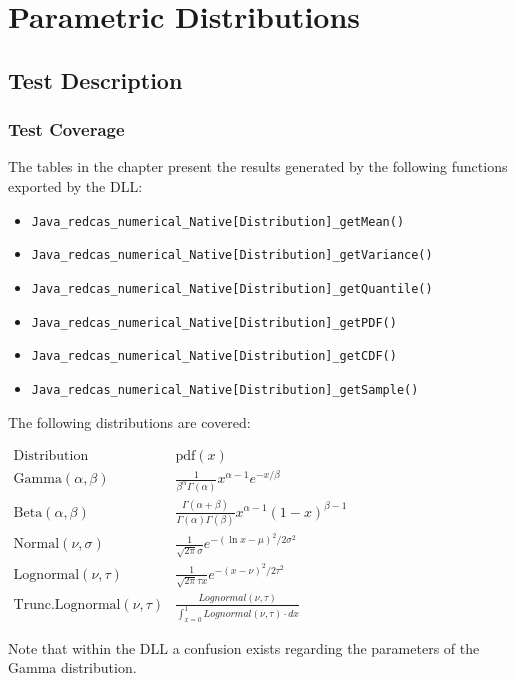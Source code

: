 \chapter{Parametric Distributions}

\section{Test Description}
\subsection{Test Coverage}
The tables in the chapter present the results generated by the following
functions exported by the DLL:
\begin{itemize}
\item  \texttt{Java\_redcas\_numerical\_Native[Distribution]\_getMean()}
\item  \texttt{Java\_redcas\_numerical\_Native[Distribution]\_getVariance()}
\item  \texttt{Java\_redcas\_numerical\_Native[Distribution]\_getQuantile()}
\item  \texttt{Java\_redcas\_numerical\_Native[Distribution]\_getPDF()}
\item  \texttt{Java\_redcas\_numerical\_Native[Distribution]\_getCDF()}
\item  \texttt{Java\_redcas\_numerical\_Native[Distribution]\_getSample()}
\end{itemize}
The following distributions are covered:

$\begin{array}{cc}
\text{Distribution} & \text{pdf}(x) \\ 
\text{Gamma}(\alpha ,\beta ) & \frac{1}{\beta ^{\alpha }\Gamma (\alpha )}x^{\alpha -1}e^{-x/\beta } \\ 
\text{Beta}(\alpha ,\beta ) & \frac{\Gamma (\alpha +\beta )}{\Gamma (\alpha)\Gamma (\beta )}x^{\alpha -1}(1-x)^{\beta -1} \\ 
\text{Normal}(\nu ,\sigma ) & \frac{1}{\sqrt{2\pi }\sigma }e^{-(\ln x-\mu)^{2}/2\sigma ^{2}} \\ 
\text{Lognormal}(\nu ,\tau ) & \frac{1}{\sqrt{2\pi }\tau x}e^{-(x-\nu)^{2}/2\tau ^{2}} \\ 
\text{Trunc.Lognormal}(\nu ,\tau ) & \frac{Lognormal(\nu ,\tau )}{\int_{x=0}^{1}Lognormal(\nu ,\tau )\cdot dx}
\end{array}$

Note that within the DLL a confusion exists regarding the parameters of the 
Gamma distribution. 


